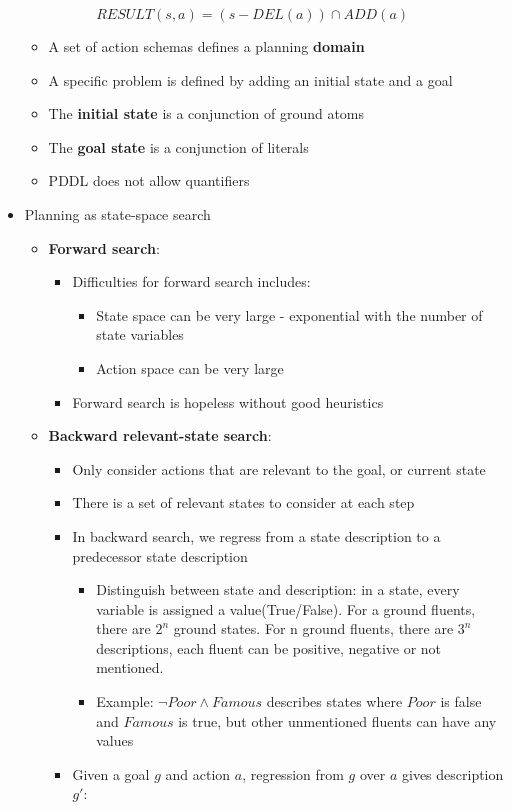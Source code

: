 \documentclass[12pt]{article}
\begin{document}
\begin{itemize}
\begin{itemize}
\begin{itemize}
\begin{itemize}
$RESULT(s, a) = (s - DEL(a)) \cap ADD(a)$
\end{itemize}
\end{itemize}
\item A set of action schemas defines a planning \textbf{domain}
\item A specific problem is defined by adding an initial state and a goal
\item The \textbf{initial state} is a conjunction of ground atoms
\item The \textbf{goal state} is a conjunction of literals 
\item PDDL does not allow quantifiers
\end{itemize}

\item Planning as state-space search 
\begin{itemize}
\item \textbf{Forward search}:
\begin{itemize}
\item Difficulties for forward search includes: 
\begin{itemize}
\item State space can be very large - exponential with the number of state variables
\item Action space can be very large
\end{itemize}
\item Forward search is hopeless without good heuristics
\end{itemize}

\item \textbf{Backward relevant-state search}:
\begin{itemize}
\item Only consider actions that are relevant to the goal, or current state
\item There is a set of relevant states to consider at each step
\item In backward search, we regress from a state description to a predecessor state description 
\begin{itemize}
\item Distinguish between state and description: in a state, every variable is assigned a value(True/False). For a ground fluents, there are $2^n$ ground states. For n ground fluents, there are $3^n$ descriptions, each fluent can be positive, negative or not mentioned.
\item Example: $\neg Poor \land  Famous$ describes states where $Poor$ is false and $Famous$ is true, but other unmentioned fluents can have any values
\end{itemize}
\item Given a goal $g$ and action $a$, regression from $g$ over $a$ gives description $g'$:\\


\end{itemize}
\end{itemize}
\end{itemize}
\end{document}
